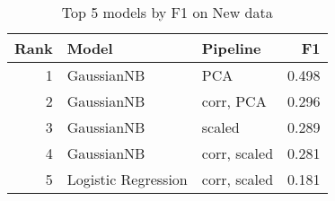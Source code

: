 \begin{table}[!htb]
\centering
\begin{tabular}{rllr}
\toprule
Rank & Model & Pipeline & F1 \\
\midrule
1 & GaussianNB & PCA & 0.498 \\
2 & GaussianNB & corr, PCA & 0.296 \\
3 & GaussianNB & scaled & 0.289 \\
4 & GaussianNB & corr, scaled & 0.281 \\
5 & Logistic Regression & corr, scaled & 0.181 \\
\bottomrule
\end{tabular}
\caption{Top 5 models by F1 on New data}
\label{table-top-5-f1-new}
\end{table}

